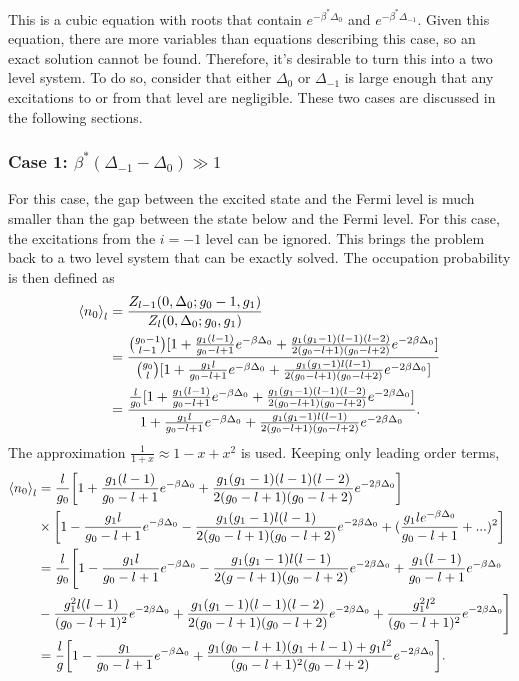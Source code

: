This is a cubic equation with roots that contain $e^{-\beta^*\Delta_0}$ and $e^{-\beta^*\Delta_{-1}}$. 
Given this equation, there are more variables than equations describing this case, so an exact solution cannot be found. Therefore, it's desirable to turn this into a two level system. To do so, consider that either $\Delta_0$ or $\Delta_{-1}$ is large enough that any excitations to or from that level are negligible. These two cases are discussed in the following sections. 

\subsubsection{Case 1: $\beta^*(\Delta_{-1}-\Delta_0)\gg 1$}
For this case, the gap between the excited state and the Fermi level is much smaller than the gap between the state below and the Fermi level. For this case, the excitations from the $i=-1$ level can be ignored. This brings the problem back to a two level system that can be exactly solved. The occupation probability is then defined as
\begin{align}
    \left<{n_0}\right>_l&=\frac{Z_{l-1}(0,\Delta_0;g_0-1,g_1)}{Z_l(0,\Delta_0;g_0,g_1)}\nonumber\\
    &=\frac{{g_0-1\choose l-1}[1+\frac{g_1(l-1)}{g_0-l+1}e^{-\beta\Delta_0} +\frac{g_1(g_1-1)(l-1)(l-2)}{2(g_0-l+1)(g_0-l+2)}e^{-2\beta\Delta_0}]}{{g_0\choose l}[1+\frac{g_1 l}{g_0-l+1}e^{-\beta\Delta_0} +\frac{g_1(g_1-1)l(l-1)}{2(g_0-l+1)(g_0-l+2)}e^{-2\beta\Delta_0}]}\nonumber\\
    &=\frac{\frac{l}{g_0} [1+\frac{g_1(l-1)}{g_0-l+1}e^{-\beta\Delta_0} +\frac{g_1(g_1-1)(l-1)(l-2)}{2(g_0-l+1)(g_0-l+2)}e^{-2\beta\Delta_0}]}{1+\frac{g_1 l}{g_0-l+1}e^{-\beta\Delta_0} +\frac{g_1(g_1-1)l(l-1)}{2(g_0-l+1)(g_0-l+2)}e^{-2\beta\Delta_0}}.
\end{align}
The approximation $\frac{1}{1+x}\approx 1-x+x^2$ is used. Keeping only leading order terms,
\begin{align}
    \left<{n_0}\right>_l&=\frac{l}{g_0}\qty[1+\frac{g_1(l-1)}{g_0-l+1}e^{-\beta\Delta_0} +\frac{g_1(g_1-1)(l-1)(l-2)}{2(g_0-l+1)(g_0-l+2)}e^{-2\beta\Delta_0}]\nonumber\\
    &\times \qty[1-\frac{g_1l}{g_0-l+1}e^{-\beta\Delta_0}-\frac{g_1(g_1-1)l(l-1)}{2(g_0-l+1)(g_0-l+2)}e^{-2\beta\Delta_0}+(\frac{g_1 l e^{-\beta\Delta_0}}{g_0-l+1}+...)^2] \nonumber\\
    &=\frac{l}{g_0}\Biggr[1-\frac{g_1l}{g_0-l+1}e^{-\beta\Delta_0}-\frac{g_1(g_1-1)l(l-1)}{2(g-l+1)(g_0-l+2)}e^{-2\beta\Delta_0}+\frac{g_1(l-1)}{g_0-l+1}e^{-\beta\Delta_0}\nonumber\\
    &-\frac{g_1^2 l(l-1)}{(g_0-l+1)^2}e^{-2\beta\Delta_0}+\frac{g_1(g_1-1)(l-1)(l-2)}{2(g_0-l+1)(g_0-l+2)}e^{-2\beta\Delta_0}+\frac{g_1^2l^2}{(g_0-l+1)^2}e^{-2\beta\Delta_0}\Biggr]\nonumber\\
    &=\frac{l}{g}\qty[1-\frac{g_1}{g_0-l+1}e^{-\beta\Delta_0}+\frac{g_1(g_0-l+1)(g_1+l-1)+g_1l^2}{(g_0-l+1)^2(g_0-l+2)}e^{-2\beta\Delta_0}].
\end{align}          
